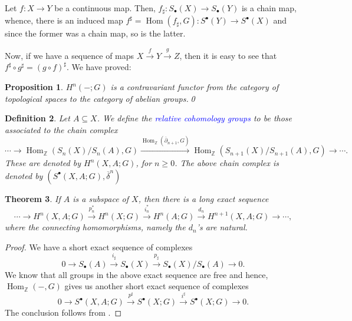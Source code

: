 \documentclass[10pt]{article}
\theoremstyle{thmstyle}
\newtheorem{theorem}{Theorem}[section]
\newtheorem{proposition}[theorem]{Proposition}
\theoremstyle{defstyle}
\newtheorem{definition}[theorem]{Definition}
\newcommand{\Z}{\mathbb{Z}}
\newcommand{\Hom}{\operatorname{Hom}}
\newcommand{\define}[1]{\textcolor{blue}{\textit{#1}}}
\renewcommand{\ge}{\geqslant}
\begin{document}
Let $f: X\to Y$ be a continuous map. Then, $f_\sharp: S_\bullet(X)\to S_\bullet(Y)$ is a chain map, whence, there is an induced map $f^\sharp = \Hom(f_\sharp, G): S^\bullet(Y)\to S^\bullet(X)$ and since the former was a chain map, so is the latter. 

Now, if we have a sequence of maps $X\xrightarrow{f} Y\xrightarrow{g} Z$, then it is easy to see that $f^\sharp\circ g^\sharp = (g\circ f)^\sharp$. We have proved:
\begin{proposition}
    $H^n(-;G)$ is a contravariant functor from the category of topological spaces to the category of abelian groups.\qed
\end{proposition}

 \begin{definition}
     Let $A\subseteq X$. We define the \define{relative cohomology groups} to be those associated to the chain complex 
     \begin{equation*}
         \cdots\to \Hom_{\Z}\left(S_n(X)/S_n(A), G\right)\xrightarrow{\Hom_{\Z}(\overline\partial_{n + 1}, G)}\Hom_\Z\left(S_{n + 1}(X)/S_{n + 1}(A), G\right)\to\cdots.
     \end{equation*}
     These are denoted by $H^n(X, A; G)$, for $n\ge 0$. The above chain complex is denoted by $(S^\bullet(X, A; G), \overline\delta^n)$
 \end{definition}

\begin{theorem}
    If $A$ is a subspace of $X$, then there is a long exact sequence 
    \begin{equation*}
        \cdots\to H^n(X, A; G)\xrightarrow{p^\ast_n} H^n(X; G)\xrightarrow{i^\ast_n} H^n(A; G)\xrightarrow{d_n} H^{n + 1}(X, A; G)\to\cdots,
    \end{equation*}
    where the connecting homomorphisms, namely the $d_n$'s are natural.
\end{theorem}
\begin{proof}
    We have a short exact sequence of complexes 
    \begin{equation*}
        0\to S_\bullet(A)\xrightarrow{i_\sharp} S_\bullet(X)\xrightarrow{p_\sharp} S_\bullet(X)/S_\bullet(A)\to 0.
    \end{equation*}
    We know that all groups in the above exact sequence are free and hence, $\Hom_{\Z}(-,G)$ gives us another short exact sequence of complexes 
    \begin{equation*}
        0\to S^\bullet(X, A; G)\xrightarrow{p^\sharp} S^\bullet(X; G)\xrightarrow{i^\sharp} S^\bullet(X; G)\to 0.
    \end{equation*}
    The conclusion follows from .
\end{proof}
\end{document}
